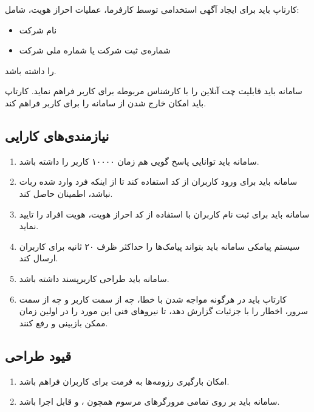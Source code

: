 \begin{enumerate}
	\addeditem
	کارتاپ باید برای ایجاد آگهی استخدامی توسط کارفرما، عملیات احراز هویت، شامل: 
	\begin{itemize}
		\item نام شرکت
		\item	 شماره‌ی ثبت شرکت یا شماره ملی شرکت
	\end{itemize}
	را داشته باشد.
	
	\addeditem
	سامانه باید قابلیت چت آنلاین را با کارشناس مربوطه برای کاربر فراهم نماید. 
	\addeditem
	کارتاپ باید امکان خارج شدن از سامانه را برای کاربر فراهم کند.
	
\end{enumerate}
\subsection{نیازمندی‌های کارایی}
\begin{enumerate}
	\item
	سامانه باید توانایی پاسخ گویی هم زمان ۱۰۰۰۰ کاربر را داشته باشد.
	\item
	سامانه باید برای ورود کاربران از کد 
	استفاده کند تا از اینکه فرد وارد شده ربات نباشد، اطمینان حاصل کند.
	\item
	سامانه باید برای ثبت نام کاربران با استفاده از کد احراز هویت، هویت افراد را تایید نماید.
	\item
	سیستم پیامکی سامانه باید بتواند پیامک‌ها را حداکثر ظرف ۲۰ ثانیه برای کاربران ارسال کند.
	\item
	سامانه باید طراحی کاربرپسند داشته باشد.
	\item
	کارتاپ باید در هرگونه مواجه شدن با خطا، چه از سمت کاربر و چه از سمت سرور، اخطار را با جزئیات گزارش دهد، تا نیروهای فنی این مورد را در اولین زمان ممکن بازبینی و رفع کنند.
	
\end{enumerate}

\subsection{قیود طراحی}
\begin{enumerate}
	\item
	امکان بارگیری رزومه‌ها به فرمت  برای کاربران فراهم باشد.
	\item
	سامانه باید بر روی تمامی مرورگر‌های مرسوم همچون
	،
	 و
	  قابل اجرا باشد.
\end{enumerate}

